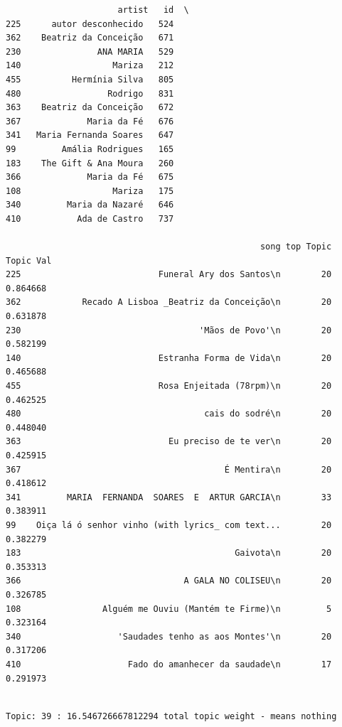 \documentclass[11pt]{article}
\begin{document}
    
    \begin{verbatim}
                      artist   id  \
225      autor desconhecido   524   
362    Beatriz da Conceição   671   
230               ANA MARIA   529   
140                  Mariza   212   
455          Hermínia Silva   805   
480                 Rodrigo   831   
363    Beatriz da Conceição   672   
367             Maria da Fé   676   
341   Maria Fernanda Soares   647   
99         Amália Rodrigues   165   
183    The Gift & Ana Moura   260   
366             Maria da Fé   675   
108                  Mariza   175   
340         Maria da Nazaré   646   
410           Ada de Castro   737   

                                                  song top Topic  Topic Val  
225                           Funeral Ary dos Santos\n        20   0.864668  
362            Recado A Lisboa _Beatriz da Conceição\n        20   0.631878  
230                                   'Mãos de Povo'\n        20   0.582199  
140                           Estranha Forma de Vida\n        20   0.465688  
455                           Rosa Enjeitada (78rpm)\n        20   0.462525  
480                                    cais do sodré\n        20   0.448040  
363                             Eu preciso de te ver\n        20   0.425915  
367                                        É Mentira\n        20   0.418612  
341         MARIA  FERNANDA  SOARES  E  ARTUR GARCIA\n        33   0.383911  
99    Oiça lá ó senhor vinho (with lyrics_ com text...        20   0.382279  
183                                          Gaivota\n        20   0.353313  
366                                A GALA NO COLISEU\n        20   0.326785  
108                Alguém me Ouviu (Mantém te Firme)\n         5   0.323164  
340                   'Saudades tenho as aos Montes'\n        20   0.317206  
410                     Fado do amanhecer da saudade\n        17   0.291973  
    \end{verbatim}

    
    \begin{Verbatim}[commandchars=\\\{\}]

Topic: 39 : 16.546726667812294 total topic weight - means nothing

    \end{Verbatim}
\end{document}
